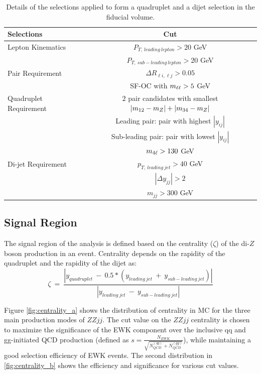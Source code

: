 \begin{table}[ht]
	\caption{Details of the selections applied to form a quadruplet and a dijet selection in the fiducial volume. 
	\label{tab:QuadDijetFidCut}}
	\begin{tabular}{|| l || c ||}
		\hline
		Selections 				&	 		Cut	\\
		\hline\hline
		Lepton Kinematics 		& $P_{T,~leading~lepton} > 20 $ GeV\\
				 				& $P_{T,~sub-leading~lepton} > 20 $ GeV\\
		\hline 
		Pair Requirement 		& $\Delta R_{\ell i,\ell	 j} > 0.05 $\\
		 						& SF-OC with $m_{\ell\ell} > 5$ GeV\\
		\hline
		Quadruplet Requirement	& $2$ pair candidates with smallest $|m_{12}	- m_{Z} | + |m_{34}	- m_{Z} |$	\\
								& Leading pair: pair with highest $|y_{ij}|$\\
								& Sub-leading pair: pair with lowest $|y_{ij}|$\\
								& $m_{4\ell} > 130 $ GeV\\
		\hline
		Di-jet Requirement		& $p_{T,~leading~jet} > 40$ GeV	\\
								& $|\Delta y_{jj}| > 2 $ \\	
								& $m_{jj} > 300$ GeV	\\
		\hline
	\end{tabular}
\end{table}

\subsection{Signal Region}
\label{subsec:SignalRegion}
The signal region of the analysis is defined based on the centrality ($\zeta$) of the di-$Z$boson production in an event. Centrality depends on the rapidity of the quadruplet and the rapidity of the dijet as:
	\begin{equation}
		\zeta~=~\frac{|y_{quadruplet}~-~ 0.5*(y_{leading~jet}~+~y_{sub-leading~jet})| }{|y_{leading~jet}~-~y_{sub-leading~jet}|}
		\label{eq:centr}
	\end{equation}

Figure \ref{fig:centrality_a} shows the distribution of centrality in MC for the three main production modes of $ZZjj$. The cut value on the $ZZjj$ centrality is chosen to maximize the significance of the EWK component over the inclusive qq and gg-initiated QCD production (defined as $s=\frac{N_{EWK}}{\sqrt{N_{QCD}^{(qq)}+N_{QCD}^{(gg)}}}$), while maintaining a good selection efficiency of EWK events. The second distribution in \ref{fig:centrality_b} shows the efficiency and significance for various cut values.  


